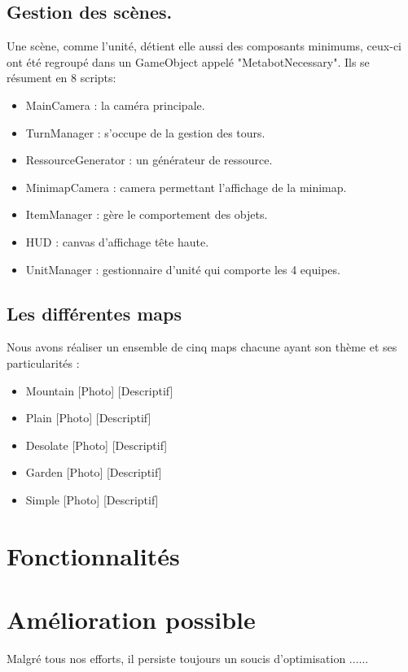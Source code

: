 \documentclass{report}
\begin{document}
\subsection{Gestion des scènes.}
Une scène, comme l'unité, détient elle aussi des composants minimums, ceux-ci ont été regroupé dans un GameObject appelé "MetabotNecessary".
Ils se résument en 8 scripts:
\begin{itemize}
\item MainCamera : la caméra principale.
\item TurnManager : s'occupe de la gestion des tours.
\item RessourceGenerator : un générateur de ressource.
\item MinimapCamera : camera permettant l'affichage de la minimap.
\item ItemManager : gère le comportement des objets.
\item HUD : canvas d'affichage tête haute.
\item UnitManager : gestionnaire d'unité qui comporte les 4 equipes.
\end{itemize}

\subsection{Les différentes maps}

Nous avons réaliser un ensemble de cinq maps chacune ayant son thème et ses particularités :
\begin{itemize}
\item Mountain
[Photo]
[Descriptif]
\item Plain
[Photo]
[Descriptif]
\item Desolate
[Photo]
[Descriptif]
\item Garden
[Photo]
[Descriptif]
\item Simple
[Photo]
[Descriptif]
\end{itemize}

\section{Fonctionnalités}



\section{Amélioration possible}

Malgré tous nos efforts, il persiste toujours un soucis d'optimisation ......
\end{document}
